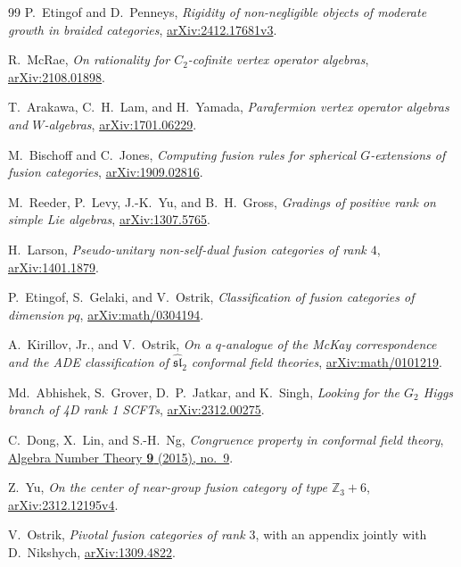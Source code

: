 \begin{thebibliography}{99}
P.~Etingof and D.~Penneys,
\emph{Rigidity of non-negligible objects of moderate growth in braided categories},
\href{https://arxiv.org/abs/2412.17681v3}{arXiv:2412.17681v3}.

R.~McRae,
\emph{On rationality for $C_2$-cofinite vertex operator algebras},
\href{https://arxiv.org/abs/2108.01898}{arXiv:2108.01898}.

T.~Arakawa, C.~H.~Lam, and H.~Yamada,
\emph{Parafermion vertex operator algebras and $W$-algebras},
\href{https://arxiv.org/abs/1701.06229}{arXiv:1701.06229}.

M.~Bischoff and C.~Jones,
\emph{Computing fusion rules for spherical $G$-extensions of fusion categories},
\href{https://arxiv.org/abs/1909.02816}{arXiv:1909.02816}.

M.~Reeder, P.~Levy, J.-K.~Yu, and B.~H.~Gross,
\emph{Gradings of positive rank on simple Lie algebras},
\href{https://arxiv.org/abs/1307.5765}{arXiv:1307.5765}.

H.~Larson,
\emph{Pseudo-unitary non-self-dual fusion categories of rank $4$},
\href{https://arxiv.org/abs/1401.1879}{arXiv:1401.1879}.

P.~Etingof, S.~Gelaki, and V.~Ostrik,
\emph{Classification of fusion categories of dimension $pq$},
\href{https://arxiv.org/abs/math/0304194}{arXiv:math/0304194}.

A.~Kirillov, Jr., and V.~Ostrik,
\emph{On a $q$-analogue of the McKay correspondence and the ADE classification
of $\widehat{\mathfrak{sl}}_2$ conformal field theories},
\href{https://arxiv.org/abs/math/0101219}{arXiv:math/0101219}.

Md.~Abhishek, S.~Grover, D.~P.~Jatkar, and K.~Singh,
\emph{Looking for the $G_2$ Higgs branch of 4D rank 1 SCFTs},
\href{https://arxiv.org/abs/2312.00275}{arXiv:2312.00275}.

C.~Dong, X.~Lin, and S.-H.~Ng,
\emph{Congruence property in conformal field theory},
\href{https://msp.org/ant/2015/9-9/ant-v9-n9-p03-s.pdf}{Algebra Number Theory
\textbf{9} (2015), no.~9}.

Z.~Yu,
\emph{On the center of near-group fusion category of type $\mathbb Z_3+6$},
\href{https://arxiv.org/abs/2312.12195v4}{arXiv:2312.12195v4}.

V.~Ostrik,
\emph{Pivotal fusion categories of rank $3$},
with an appendix jointly with D.~Nikshych,
\href{https://arxiv.org/abs/1309.4822}{arXiv:1309.4822}.


\end{thebibliography}
